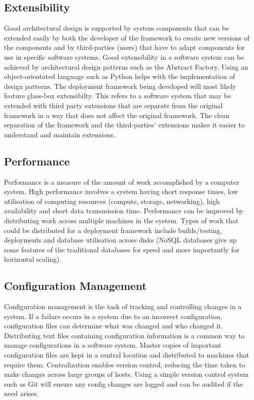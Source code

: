 \subsection{Extensibility}
Good architectural design is supported by system components that can be extended easily by both the developer of the framework to create new versions of the components and by third-parties (users) that have to adapt components for use in specific software systems. Good extensibility in a software system can be achieved by architectural design patterns such as the Abstract Factory. Using an object-orientated language such as Python helps with the implementation of design patterns. The deployment framework being developed will most likely feature glass-box extensibilty. This refers to a software system that may be extended with third party extensions that are separate from the original framework in a way that does not affect the original framework. The clean separation of the framework and the third-parties' extensions makes it easier to understand and maintain extensions. \cite{glassbox}

\subsection{Performance}
Performance is a measure of the amount of work accomplished by a computer system. High performance involves a system having short response times, low utilisation of computing resources (compute, storage, networking), high availability and short data transmission time. Performance can be improved by distributing work across multiple machines in the system. Types of work that could be distributed for a deployment framework include builds/testing, deployments and database utilisation across disks (NoSQL databases give up some features of the traditional databases for speed and more importantly for horizontal scaling).

\subsection{Configuration Management}
Configuration management is the task of tracking and controlling changes in a system. If a failure occurs in a system due to an incorrect configuration, configuration files can determine what was changed and who changed it. Distributing text files containing configuration information is a common way to manage configurations in a software system. Master copies of important configuration files are kept in a central location and distributed to machines that require them. Centralization enables version control, reducing the time taken to make changes across large groups of hosts. Using a simple version control system such as Git will ensure any config changes are logged and can be audited if the need arises.

